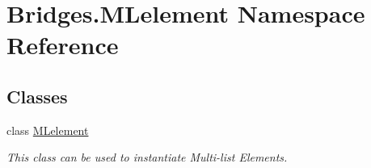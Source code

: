 \hypertarget{namespace_bridges_1_1_m_lelement}{}\section{Bridges.\+M\+Lelement Namespace Reference}
\label{namespace_bridges_1_1_m_lelement}
\subsection*{Classes}
\begin{DoxyCompactItemize}
\item 
class \hyperlink{class_bridges_1_1_m_lelement_1_1_m_lelement}{M\+Lelement}
\begin{DoxyCompactList}\small\item\em This class can be used to instantiate Multi-\/list Elements. \end{DoxyCompactList}\end{DoxyCompactItemize}
